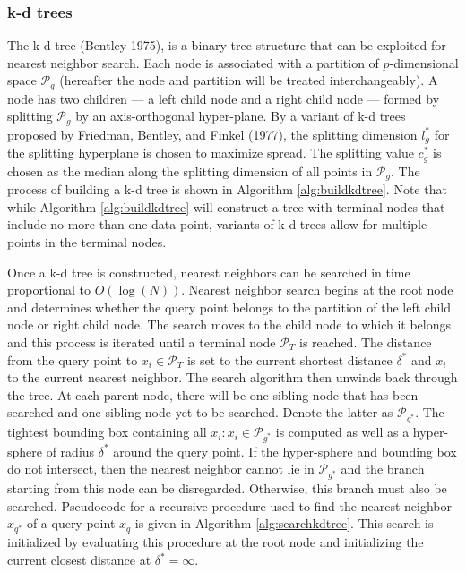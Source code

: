 \documentclass[12pt]{article}
\begin{document}
\hypertarget{k-d-trees}{%
\subsubsection*{k-d trees}\label{k-d-trees}}

The k-d tree (Bentley 1975), is a binary tree structure that can be exploited for nearest neighbor search. Each node is associated with a partition of \(p\)-dimensional space \(\mathcal{P}_g\) (hereafter the node and partition will be treated interchangeably). A node has two children --- a left child node and a right child node --- formed by splitting \(\mathcal{P}_g\) by an axis-orthogonal hyper-plane. By a variant of k-d trees proposed by Friedman, Bentley, and Finkel (1977), the splitting dimension \(l_g^*\) for the splitting hyperplane is chosen to maximize spread. The splitting value \(c_g^*\) is chosen as the median along the splitting dimension of all points in \(\mathcal{P}_g\). The process of building a k-d tree is shown in Algorithm \ref{alg:buildkdtree}. Note that while Algorithm \ref{alg:buildkdtree} will construct a tree with terminal nodes that include no more than one data point, variants of k-d trees allow for multiple points in the terminal nodes.

Once a k-d tree is constructed, nearest neighbors can be searched in time proportional to \(O(\log(N))\). Nearest neighbor search begins at the root node and determines whether the query point belongs to the partition of the left child node or right child node. The search moves to the child node to which it belongs and this process is iterated until a terminal node \(\mathcal{P}_T\) is reached. The distance from the query point to \(x_i\in\mathcal{P}_T\) is set to the current shortest distance \(\delta^*\) and \(x_i\) to the current nearest neighbor. The search algorithm then unwinds back through the tree. At each parent node, there will be one sibling node that has been searched and one sibling node yet to be searched. Denote the latter as \(\mathcal{P}_{g^*}\). The tightest bounding box containing all \(x_i:x_i\in\mathcal{P}_{g^*}\) is computed as well as a hyper-sphere of radius \(\delta^*\) around the query point. If the hyper-sphere and bounding box do not intersect, then the nearest neighbor cannot lie in \(\mathcal{P}_{g^*}\) and the branch starting from this node can be disregarded. Otherwise, this branch must also be searched. Pseudocode for a recursive procedure used to find the nearest neighbor \(x_{q^*}\) of a query point \(x_q\) is given in Algorithm \ref{alg:searchkdtree}. This search is initialized by evaluating this procedure at the root node and initializing the current closest distance at \(\delta^*=\infty\).
\end{document}
